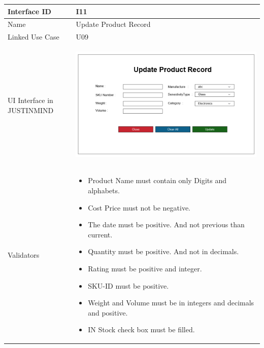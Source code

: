 \documentclass[12pt,a4paper]{report}
\begin{document}
\begin{tabular}{ | m{3cm} | m{12cm}| } \hline

Interface ID & I11  \\\hline

Name  &  Update Product Record \\ \hline

Linked Use Case & U09	  \\ \hline


UI Interface in JUSTINMIND & \begin{center} \includegraphics[scale=0.3]{./User Interface/UI-009 Update Product Record@1x.png}\end{center}  \\ \hline

Validators & 
\begin{itemize}
\item   Product Name must contain only Digits and alphabets.
\item Cost Price must not be negative.
\item The date must be positive. And not previous than current.
\item Quantity must be positive. And not in decimals.
\item Rating must be positive and integer.
\item SKU-ID must be positive.
\item Weight and Volume must be in integers and decimals and positive.
\item IN Stock check box must be filled.


\end{itemize}
\\ \hline

\end{tabular} 
\end{document}
